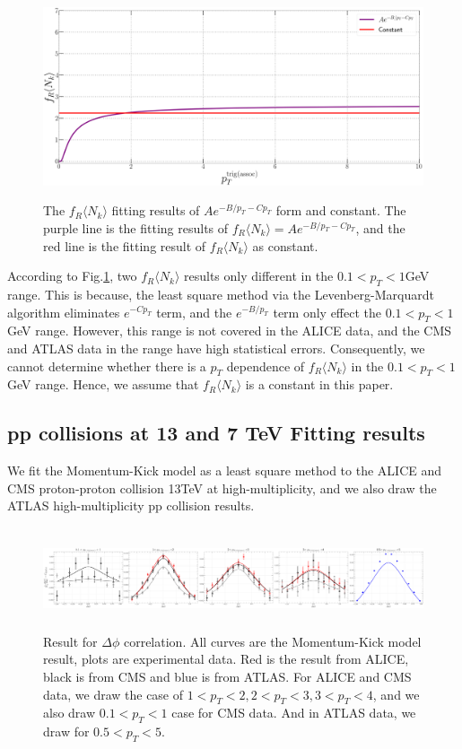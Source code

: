 \documentclass[jkps,fleqn,showpacs,showkeys]{revtex4}
\begin{document}
\begin{figure}[ht]
\centering
\includegraphics[width=12cm, height=6cm]{./Figures/ptVSnone}
\caption{The $f_R\langle N_k \rangle$ fitting results of $Ae^{-{B} / p_T -C p_{T}}$ form and constant. The purple line is the fitting results of $f_R\langle N_k \rangle = Ae^{-{B} / p_T -C p_{T}}$, and the red line is the fitting result of $f_R\langle N_k \rangle$ as constant. }
\label{figure:ptVSnone}
\end{figure}

According to Fig.\ref{figure:ptVSnone}, two $f_R \langle N_k \rangle$ results only different in the $0.1<p_T<1$GeV range.
This is because, the least square method via the Levenberg-Marquardt algorithm eliminates $e^{-Cp_T}$ term, and the $e^{-B/p_T}$ term only effect the $0.1<p_T<1$GeV range.
However, this range is not covered in the ALICE data, and the CMS and ATLAS data in the range have high statistical errors.
Consequently, we cannot determine whether there is a $p_T$ dependence of $f_R\langle N_k \rangle$ in the $0.1<p_T<1$GeV range.
Hence, we assume that $f_R\langle N_k \rangle$ is a constant in this paper.


\subsection{pp collisions at 13 and 7 TeV Fitting results}
\label{subsec: pp collisions Fitting results}

We fit the Momentum-Kick model as a least square method to the ALICE and CMS proton-proton collision 13TeV at high-multiplicity\cite{alice, cms}, and we also draw the ATLAS high-multiplicity pp collision results\cite{atlas}.

\begin{figure}[ht]
\centering
\includegraphics[width=18cm, height=3cm]{./Figures/Paper_phiCorr}
\caption{Result for $\Delta \phi$ correlation. All curves are the Momentum-Kick model result, plots are experimental data.
Red is the result from ALICE, black is from CMS and blue is from ATLAS.
For ALICE and CMS data, we draw the case of $1<p_T<2, 2<p_T<3, 3<p_T<4$, and we also draw $0.1<p_T<1$ case for CMS data. And in ATLAS data, we draw for $0.5<p_T<5$.}
\label{figure:phicorr}
\end{figure}
\end{document}
